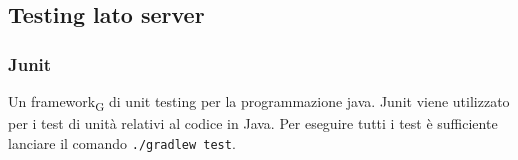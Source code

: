 \subsection{Testing lato server}
\subsubsection{Junit}
Un framework\textsubscript{G} di unit testing per la programmazione java. Junit viene utilizzato per i test di unità relativi al codice in Java.
Per eseguire tutti i test è sufficiente lanciare il comando \texttt{./gradlew test}.
